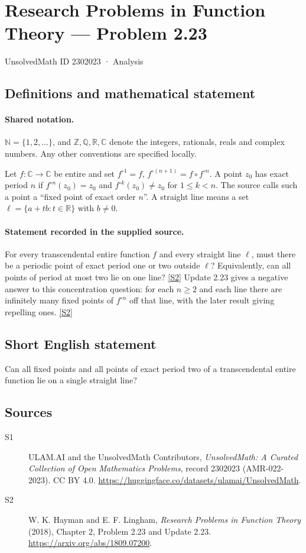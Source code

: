 \documentclass[11pt]{article}
\newcommand{\sref}[2]{\hyperlink{source:#1:#2}{[S#2]}}
\begin{document}
\setcounter{section}{2302022}
\section{Research Problems in Function Theory — Problem 2.23}\label{2302023}
{\small\sffamily UnsolvedMath ID 2302023 · Analysis}
\subsection{Definitions and mathematical statement}

\paragraph{Shared notation.}$\mathbb N=\{1,2,\ldots\}$, and $\mathbb Z,\mathbb Q,\mathbb R,\mathbb C$ denote the integers, rationals, reals and complex numbers. Any other conventions are specified locally.


Let $f:\mathbb C\to\mathbb C$ be entire and set $f^{\circ1}=f$, $f^{\circ(n+1)}=f\circ f^{\circ n}$.
A point $z_0$ has exact period $n$ if $f^{\circ n}(z_0)=z_0$ and $f^{\circ k}(z_0)\ne z_0$ for $1\le k<n$.
The source calls such a point a ``fixed point of exact order $n$''.
A straight line means a set $\ell=\{a+tb:t\in\mathbb R\}$ with $b\ne0$.

\paragraph{Statement recorded in the supplied source.}
For every transcendental entire function $f$ and every straight line $\ell$, must there be a periodic point of exact period one or two outside $\ell$? Equivalently, can all points of period at most two lie on one line? \sref{2302023}{2}
Update 2.23 gives a negative answer to this concentration question: for each $n\ge2$ and each line there are infinitely many fixed points of $f^{\circ n}$ off that line, with the later result giving repelling ones. \sref{2302023}{2}
\subsection{Short English statement}
Can all fixed points and all points of exact period two of a transcendental entire function lie on a single straight line?
\subsection{Sources}
\begin{description}
\item[\hypertarget{source:2302023:1}{S1}] ULAM.AI and the UnsolvedMath Contributors, \emph{UnsolvedMath: A Curated Collection of Open Mathematics Problems}, record 2302023 (AMR-022-2023). CC BY 4.0. \url{https://huggingface.co/datasets/ulamai/UnsolvedMath}.
\item[\hypertarget{source:2302023:2}{S2}] W. K. Hayman and E. F. Lingham, \emph{Research Problems in Function Theory} (2018), Chapter 2, Problem 2.23 and Update 2.23. \url{https://arxiv.org/abs/1809.07200}.
\end{description}
\label{end:2302023}
\end{document}
